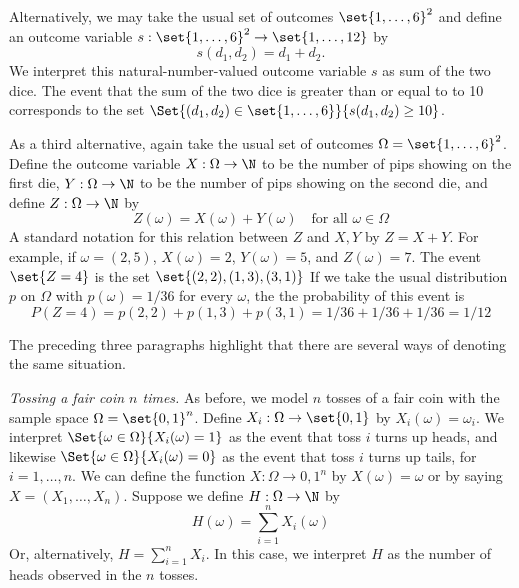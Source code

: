 Alternatively, we may take the usual set of outcomes $\set{1, \dots , 6}^2$ and define an outcome variable $s: \set{1, \dots , 6}^2 \to \set{1, \dots , 12}$ by
\[
s(d_1, d_2) = d_1 + d_2.
\]
We interpret this natural-number-valued outcome variable $s$ as sum of the two dice.
The event that the sum of the two dice is greater than or equal to to 10 corresponds to the set $\Set{(d_1, d_2) \in \set{1, \dots , 6}}{s(d_1, d_2) \geq 10}$.


As a third alternative, again take the usual set of outcomes $\Omega  = \set{1, \dots , 6}^2$.
Define the outcome variable $X: \Omega  \to \N  $ to be the number of pips showing on the first die, $Y: \Omega  \to \N  $ to be the number of pips showing on the second die, and define $Z: \Omega  \to \N  $ by
\[
Z(\omega ) = X(\omega ) + Y(\omega ) \quad \text{for all } \omega  \in \Omega
\]
A standard notation for this relation between $Z$ and $X,Y$ by $Z = X + Y$.
For example, if $\omega  = (2,5)$, $X(\omega ) = 2$, $Y(\omega ) = 5$, and $Z(\omega ) = 7$.
The event $\set{Z = 4}$ is the set $\set{(2,2), (1,3), (3,1)}$
If we take the usual distribution $p$ on $\Omega $ with $p(\omega ) = 1/36$ for every $\omega $, the the probability of this event is
\[
P(Z = 4) = p(2,2) + p(1,3) + p(3, 1) = 1/36+1/36+1/36 = 1/12
\]

The preceding three paragraphs highlight that there are several ways of denoting the same situation.

\textit{Tossing a fair coin $n$ times.}
As before, we model $n$ tosses of a fair coin with the sample space $\Omega  = \set{0,1}^n$.
Define $X_i: \Omega  \to \set{0,1}$ by $X_i(\omega ) = \omega _i$.
We interpret $\Set{\omega  \in \Omega }{X_i(\omega ) = 1}$ as the event that toss $i$ turns up heads, and likewise $\Set{\omega \in \Omega }{X_i(\omega ) = 0}$ as the event that toss $i$ turns up tails, for $i = 1, \dots , n$.
We can define the function $X: \Omega  \to {0,1}^n$ by $X(\omega ) = \omega $ or by saying $X = (X_1, \dots , X_n)$.
Suppose we define $H: \Omega  \to \N  $ by
\[
H(\omega ) = \sum_{i= 1}^{n} X_i(\omega )
\]
Or, alternatively, $H = \sum_{i = 1}^{n} X_i$.
In this case, we interpret $H$ as the number of heads observed in the $n$ tosses.


\blankpage